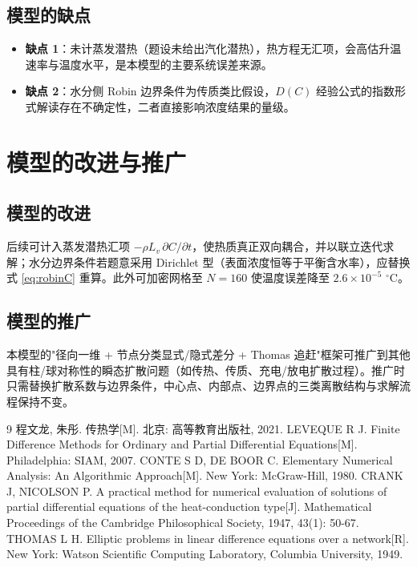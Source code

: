 \documentclass[12pt,a4paper]{ctexart}
\begin{document}
\subsection{模型的缺点}
\begin{itemize}
\item \textbf{缺点 1}：未计蒸发潜热（题设未给出汽化潜热），热方程无汇项，会高估升温速率与温度水平，是本模型的主要系统误差来源。
\item \textbf{缺点 2}：水分侧 Robin 边界条件为传质类比假设，$D(C)$ 经验公式的指数形式解读存在不确定性，二者直接影响浓度结果的量级。
\end{itemize}

\section{模型的改进与推广}
\subsection{模型的改进}
后续可计入蒸发潜热汇项 $-\rho L_v\,\partial C/\partial t$，使热质真正双向耦合，并以联立迭代求解；水分边界条件若题意采用 Dirichlet 型（表面浓度恒等于平衡含水率），应替换式 \eqref{eq:robinC} 重算。此外可加密网格至 $N=160$ 使温度误差降至 $2.6\times10^{-5}$ $^\circ$C。
\subsection{模型的推广}
本模型的"径向一维 + 节点分类显式/隐式差分 + Thomas 追赶"框架可推广到其他具有柱/球对称性的瞬态扩散问题（如传热、传质、充电/放电扩散过程）。推广时只需替换扩散系数与边界条件，中心点、内部点、边界点的三类离散结构与求解流程保持不变。

\begin{thebibliography}{9}
 程文龙, 朱彤. 传热学[M]. 北京: 高等教育出版社, 2021.
 LEVEQUE R J. Finite Difference Methods for Ordinary and Partial Differential Equations[M]. Philadelphia: SIAM, 2007.
 CONTE S D, DE BOOR C. Elementary Numerical Analysis: An Algorithmic Approach[M]. New York: McGraw-Hill, 1980.
 CRANK J, NICOLSON P. A practical method for numerical evaluation of solutions of partial differential equations of the heat-conduction type[J]. Mathematical Proceedings of the Cambridge Philosophical Society, 1947, 43(1): 50-67.
 THOMAS L H. Elliptic problems in linear difference equations over a network[R]. New York: Watson Scientific Computing Laboratory, Columbia University, 1949.
\end{thebibliography}
\end{document}
